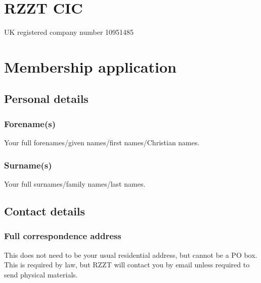 \documentclass[a4paper,10pt]{article}
\begin{document}
\begin{Form}

\raggedright

\section{RZZT CIC}

UK registered company number 10951485

\section{Membership application}

\subsection{Personal details}

\subsubsection{Forename(s)}

Your full forenames/given names/first names/Christian names.

\begin{framed}%
  \TextField[width=\textwidth,maxlen=75,donotscroll=true,name=forename]{ }%
\end{framed}%

\subsubsection{Surname(s)}

Your full surnames/family names/last names.

\begin{framed}%
  \TextField[width=\textwidth,donotscroll=true,name=surname]{ }%
\end{framed}%

\subsection{Contact details}

\subsubsection{Full correspondence address}

This does not need to be your usual residential address, but cannot be a PO box. This is required by law, but RZZT will contact you by email unless required to send physical materials.


\end{Form}
\end{document}
